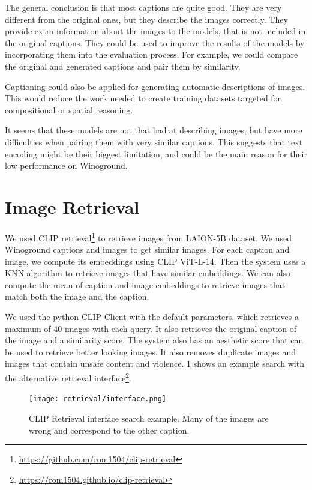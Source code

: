 The general conclusion is that most captions are quite good. They are very different from the original ones, but they describe the images correctly. They provide extra information about the images to the models, that is not included in the original captions. They could be used to improve the results of the models by incorporating them into the evaluation process. For example, we could compare the original and generated captions and pair them by similarity. 

Captioning could also be applied for generating automatic descriptions of images. This would reduce the work needed to create training datasets targeted for compositional or spatial reasoning.

It seems that these models are not that bad at describing images, but have more difficulties when pairing them with very similar captions. This suggests that text encoding might be their biggest limitation, and could be the main reason for their low performance on Winoground.

\section{Image Retrieval} \label{image_retrieval}

We used CLIP retrieval\footnote{\url{https://github.com/rom1504/clip-retrieval}} to retrieve images from LAION-5B \cite{schuhmann2022laionb} dataset. We used Winoground captions and images to get similar images. For each caption and image, we compute its embeddings using CLIP ViT-L-14. Then the system uses a KNN algorithm to retrieve images that have similar embeddings. We can also compute the mean of caption and image embeddings to retrieve images that match both the image and the caption. 

We used the python CLIP Client with the default parameters, which retrieves a maximum of 40 images with each query. It also retrieves the original caption of the image and a similarity score. The system also has an aesthetic score that can be used to retrieve better looking images. It also removes duplicate images and images that contain unsafe content and violence. \cref{fig:retrieval_interface} shows an example search with the alternative retrieval interface\footnote{\url{https://rom1504.github.io/clip-retrieval}}.

\begin{figure}[ht]
    \centering
    \texttt{[image: retrieval/interface.png]}
    \caption{CLIP Retrieval interface search example. Many of the images are wrong and correspond to the other caption.}
    \label{fig:retrieval_interface}
\end{figure}

